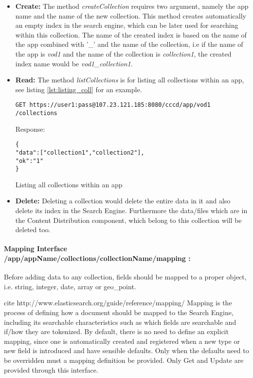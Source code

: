 \begin{itemize}
\item \textbf{Create:} The method \textit{createCollection} requires two argument, namely the app name and the name of the new collection. This method creates automatically an empty index in the search engine, which can be later used for searching within this collection. The name of the created index is based on the name of the app combined with '\_' and the name of the collection, i.e if the name of the app is \textit{vod1} and the name of the collection is \textit{collection1}, the created index name would be \textit{vod1\_collection1}.

\item \textbf{Read:} The method \textit{listCollections} is for listing all collections within an app, see listing \ref{lst:listing_coll} for an example.

\begin{code}
\begin{verbatim}
GET https://user1:pass@107.23.121.185:8080/cccd/app/vod1
/collections
\end{verbatim}
Response:
\begin{verbatim}
{
"data":["collection1","collection2"],
"ok":"1"
}
\end{verbatim}
\caption{Listing all collections within an app}
\label{lst:listing_coll}
\end{code}

\item \textbf{Delete:} Deleting a collection would delete the entire data in it and also delete its index in the Search Engine. Furthermore the data/files which are in the Content Distribution component, which belong to this collection will be deleted too.
\end{itemize}

\paragraph{Mapping Interface /app/{appName}/collections/{collectionName}/mapping :} Before adding data to any collection, fields should be mapped to a proper object, i.e. string, integer, date, array or geo\_point. 

cite http://www.elasticsearch.org/guide/reference/mapping/
Mapping is the process of defining how a document should be mapped to the Search Engine, including its searchable characteristics such as which fields are searchable and if/how they are tokenized.  By default, there is no need to define an explicit mapping, since one is automatically created and registered when a new type or new field is introduced and have sensible defaults. Only when the defaults need to be overridden must a mapping definition be provided. Only Get and Update are provided through this interface.
 
